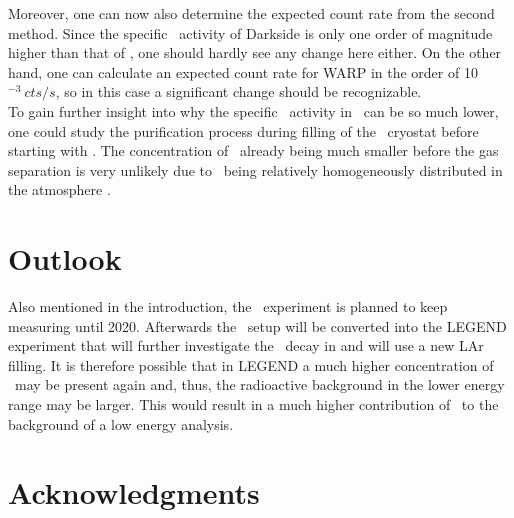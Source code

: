 \documentclass[encoding=utf8,british]{tumphthesis}
\begin{document}
Moreover, one can now also determine the expected count rate from the second method.
Since the specific \Kr\ activity of Darkside is only one order of magnitude higher than that of \gerda, one should hardly see any change here either.
On the other hand, one can calculate an expected count rate for WARP in the order of 10$^{-3} \  \unit{cts} / \unit{s}$, so in this case a significant change should be recognizable.
\\

To gain further insight into why the specific \Kr\ activity in \gerda\ can be so much lower, one could study the purification process during filling of the \gerda\ cryostat before starting with \PI.
The concentration of \Kr\ already being much smaller before the gas separation is very unlikely due to  \Kr\ being relatively homogeneously distributed in the atmosphere \cite{j._jacob_atmospheric_1987}.
\\



\section{Outlook}
Also mentioned in the introduction, the \gerda\ experiment is planned to keep measuring until 2020.
Afterwards the \gerda\ setup will be converted into the LEGEND experiment that will further investigate the \onbb\ decay in  and will use a new LAr filling.
It is therefore possible that in LEGEND a much higher concentration of \Kr\ may be present again and, thus, the radioactive background in the lower energy range may be larger.
This would result in a much higher contribution of \Kr\ to the background of a low energy analysis.
\\





\newpage
\section*{Acknowledgments}




\backmatter
\printbibliography
%
%
\listoffigures
\end{document}
